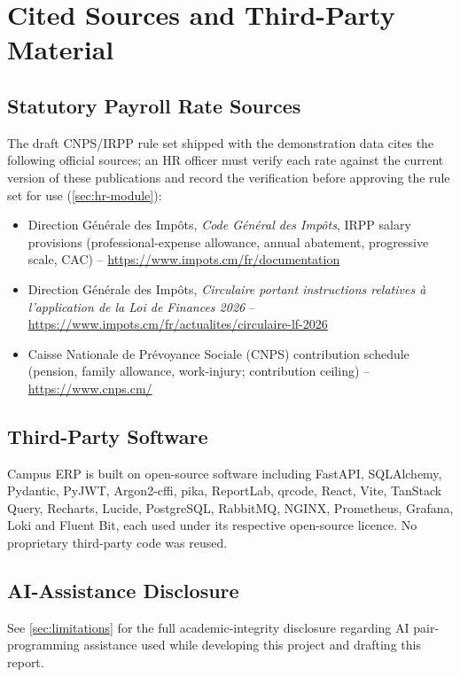 \section{Cited Sources and Third-Party Material}
\label{app:sources}

\subsection{Statutory Payroll Rate Sources}
The draft CNPS/IRPP rule set shipped with the demonstration data cites the
following official sources; an HR officer must verify each rate against the
current version of these publications and record the verification before
approving the rule set for use (\cref{sec:hr-module}):
\begin{itemize}[leftmargin=1.4em]
  \item Direction G\'en\'erale des Imp\^ots, \textit{Code G\'en\'eral des
    Imp\^ots}, IRPP salary provisions (professional-expense allowance,
    annual abatement, progressive scale, CAC) --
    \url{https://www.impots.cm/fr/documentation}
  \item Direction G\'en\'erale des Imp\^ots, \textit{Circulaire portant
    instructions relatives \`a l'application de la Loi de Finances 2026} --
    \url{https://www.impots.cm/fr/actualites/circulaire-lf-2026}
  \item Caisse Nationale de Pr\'evoyance Sociale (CNPS) contribution schedule
    (pension, family allowance, work-injury; contribution ceiling) --
    \url{https://www.cnps.cm/}
\end{itemize}

\subsection{Third-Party Software}
Campus ERP is built on open-source software including FastAPI, SQLAlchemy,
Pydantic, PyJWT, Argon2-cffi, pika, ReportLab, qrcode, React, Vite,
TanStack Query, Recharts, Lucide, PostgreSQL, RabbitMQ, NGINX, Prometheus,
Grafana, Loki and Fluent Bit, each used under its respective open-source
licence. No proprietary third-party code was reused.

\subsection{AI-Assistance Disclosure}
See \cref{sec:limitations} for the full academic-integrity disclosure
regarding AI pair-programming assistance used while developing this project
and drafting this report.
